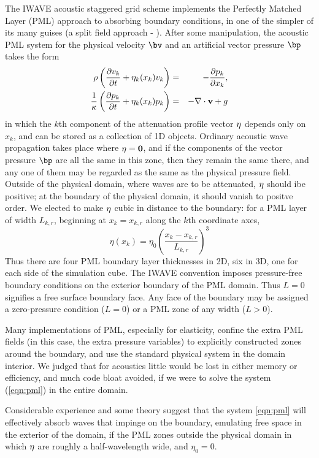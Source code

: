 The IWAVE acoustic staggered grid scheme implements the Perfectly
Matched Layer (PML) approach to absorbing boundary conditions, in one of the
simpler of its many guises (a split field approach -
\cite[]{Habashy:07}). After some manipulation, the acoustic PML system
for the physical velocity $\bv$ and an artificial vector pressure
$\bp$ takes the form
\begin{eqnarray}
\label{eqn:pml}
\rho \left(\frac{\partial v_k}{\partial t} + \eta_k(x_k)v_k\right) &=&
- \frac{\partial p_k}{\partial x_k}, \nonumber \\
\frac{1}{\kappa}\left(\frac{\partial p_k}{\partial t} + \eta_k(x_k)p_k\right) &=& -\nabla \cdot {\bf v} + g
\end{eqnarray}
in which the $k$th component of the attenuation profile vector ${\bf \eta}$ depends
only on $x_k$, and can be stored as a collection of 1D objects. Ordinary acoustic
wave propagation takes place where ${\bf \eta}={\bf 0}$, and if the
components of the vector pressure $\bp$ are all the same in this zone,
then they remain the same there, and any one of them may be regarded
as the same as the physical pressure field. Outside of the physical
domain, where waves are to be attenuated, ${\bf {\eta}}$ should
ibe positive; at the boundary of the physical domain, it should vanish to positve order. We
elected to make ${\bf {\eta}}$ cubic in distance to the boundary: for
a PML layer of width $L_{k,r}$, beginning at $x_k=x_{k,r}$ along the $k$th
coordinate axes,
\[
\eta(x_k) = \eta_0 \left(\frac{x_k-x_{k,r}}{L_{k,r}}\right)^3
\]
Thus there are four PML boundary layer thicknesses in 2D, six in 3D, one
for each side of the simulation cube. The IWAVE convention imposes
pressure-free boundary conditions on the exterior boundary of the PML
domain. Thus $L=0$ signifies a free surface boundary face. Any face of
the boundary may be assigned a zero-pressure condition ($L=0$) or a
PML zone of any width ($L>0$).

Many implementations of PML, especially for elasticity, confine the
extra PML fields (in this case, the extra pressure variables) to
explicitly constructed zones around the boundary, and use the standard
physical system in the domain interior. We judged that for acoustics little would be
lost in either memory or efficiency, and much code bloat avoided, if
we were to solve the system (\ref{eqn:pml}) in the entire domain.

Considerable experience and some theory
\cite[]{Habashy:07,moczoetal:06} suggest that the system \ref{eqn:pml} will
effectively absorb waves that impinge on the boundary, emulating free
space in the exterior of the domain, if the PML zones outside the
physical domain in which ${\bf {\eta}}$ are roughly a half-wavelength
wide, and $\eta_0=0$.

